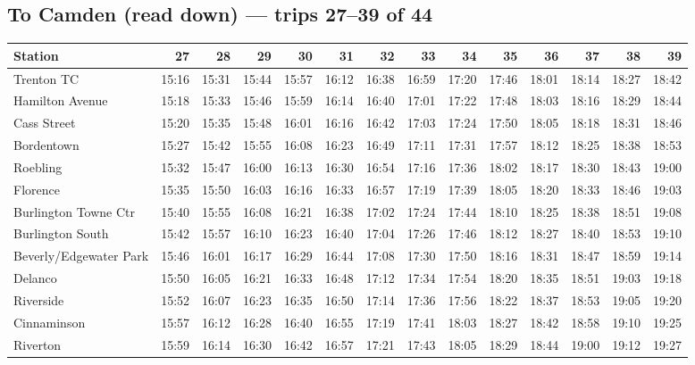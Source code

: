 \subsection*{To Camden (read down) --- trips 27--39 of 44}
\begin{center}\footnotesize\setlength{\tabcolsep}{3pt}\begin{tabular}{@{}lrrrrrrrrrrrrr@{}}\toprule
Station & 27 & 28 & 29 & 30 & 31 & 32 & 33 & 34 & 35 & 36 & 37 & 38 & 39 \\\midrule
Trenton TC & 15:16 & 15:31 & 15:44 & 15:57 & 16:12 & 16:38 & 16:59 & 17:20 & 17:46 & 18:01 & 18:14 & 18:27 & 18:42 \\
Hamilton Avenue & 15:18 & 15:33 & 15:46 & 15:59 & 16:14 & 16:40 & 17:01 & 17:22 & 17:48 & 18:03 & 18:16 & 18:29 & 18:44 \\
Cass Street & 15:20 & 15:35 & 15:48 & 16:01 & 16:16 & 16:42 & 17:03 & 17:24 & 17:50 & 18:05 & 18:18 & 18:31 & 18:46 \\
Bordentown & 15:27 & 15:42 & 15:55 & 16:08 & 16:23 & 16:49 & 17:11 & 17:31 & 17:57 & 18:12 & 18:25 & 18:38 & 18:53 \\
Roebling & 15:32 & 15:47 & 16:00 & 16:13 & 16:30 & 16:54 & 17:16 & 17:36 & 18:02 & 18:17 & 18:30 & 18:43 & 19:00 \\
Florence & 15:35 & 15:50 & 16:03 & 16:16 & 16:33 & 16:57 & 17:19 & 17:39 & 18:05 & 18:20 & 18:33 & 18:46 & 19:03 \\
Burlington Towne Ctr & 15:40 & 15:55 & 16:08 & 16:21 & 16:38 & 17:02 & 17:24 & 17:44 & 18:10 & 18:25 & 18:38 & 18:51 & 19:08 \\
Burlington South & 15:42 & 15:57 & 16:10 & 16:23 & 16:40 & 17:04 & 17:26 & 17:46 & 18:12 & 18:27 & 18:40 & 18:53 & 19:10 \\
Beverly/Edgewater Park & 15:46 & 16:01 & 16:17 & 16:29 & 16:44 & 17:08 & 17:30 & 17:50 & 18:16 & 18:31 & 18:47 & 18:59 & 19:14 \\
Delanco & 15:50 & 16:05 & 16:21 & 16:33 & 16:48 & 17:12 & 17:34 & 17:54 & 18:20 & 18:35 & 18:51 & 19:03 & 19:18 \\
Riverside & 15:52 & 16:07 & 16:23 & 16:35 & 16:50 & 17:14 & 17:36 & 17:56 & 18:22 & 18:37 & 18:53 & 19:05 & 19:20 \\
Cinnaminson & 15:57 & 16:12 & 16:28 & 16:40 & 16:55 & 17:19 & 17:41 & 18:03 & 18:27 & 18:42 & 18:58 & 19:10 & 19:25 \\
Riverton & 15:59 & 16:14 & 16:30 & 16:42 & 16:57 & 17:21 & 17:43 & 18:05 & 18:29 & 18:44 & 19:00 & 19:12 & 19:27 \\

\end{tabular}
\end{center}
